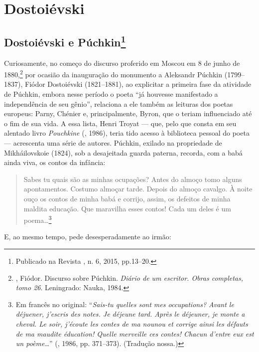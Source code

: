 \part{Dostoiévski}

\chapter{Dostoiévski e Púchkin\footnote{Publicado na Revista {}, n. 6, 2015, pp.13--20.}}

Curiosamente, no começo do discurso proferido em Moscou em 8 de junho de
1880,\footnote{, Fiódor. Discurso sobre Púchkin. \emph{Diário de um escritor. Obras completas, tomo 26}. Leningrado: Nauka, 1984.} por ocasião da inauguração do monumento a Aleksandr Púchkin
(1799--1837), Fiódor Dostoiévski (1821--1881), ao explicitar a primeira fase da atividade de Púchkin, embora nesse período o poeta ``já houvesse manifestado a independência de seu gênio'', relaciona a
ele também as
leituras dos poetas europeus: Parny, Chénier e, principalmente, Byron,
que o teriam influenciado até o fim de sua vida. A essa lista, Henri
Troyat --- que, pelo que consta em seu alentado livro \emph{Pouchkine} (, 1986),
teria tido acesso à biblioteca pessoal do poeta --- acrescenta uma série
de autores. Púchkin, exilado na propriedade de Mikháilovskoie (1824), sob a
desajeitada guarda paterna, recorda, com a babá
ainda viva, os contos da infância:

\begin{quotation}
Sabes tu quais são as minhas ocupações? Antes do almoço tomo alguns apontamentos. Costumo almoçar tarde. Depois do almoço cavalgo. À noite ouço os contos de minha babá e corrijo, assim, os defeitos de minha maldita educação. Que maravilha esses contos! Cada um deles é um poema\ldots{}\footnote{Em francês no original: ``\emph{Sais-tu quelles sont mes occupations? Avant le déjuener, j'escris des notes. Je déjeune tard. Après le déjeuner, je monte a cheval. Le soir, j'écoute les contes de ma nounou et corrige ainsi les défauts de ma maudite éducation! Quelle merveille ces contes! Chacun d'entre eux est un poème\ldots{}}'' (, 1986, pp. 371--373). (Tradução nossa.)}
\end{quotation}


E, ao mesmo tempo, pede desesperadamente ao irmão:

